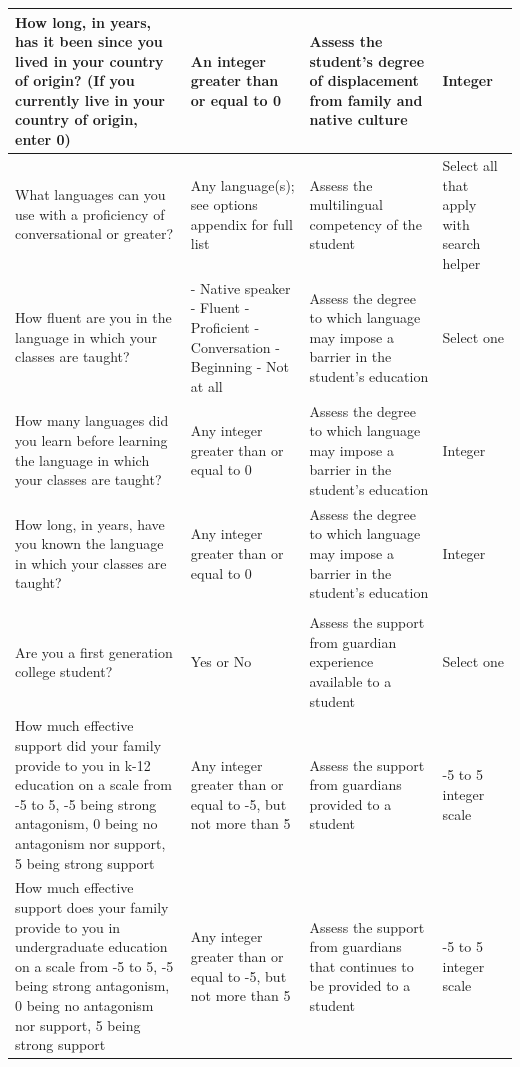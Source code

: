\documentclass[10pt, twocolumn]{article}
\begin{document}
\begin{xltabular}{\textwidth}{|p{0.3\textwidth}|p{0.3\textwidth}|p{0.2\textwidth}|X|}
    How long, in years, has it been since you lived in your country of origin? (If you currently live in your country of origin, enter 0) & An integer greater than or equal to 0 & Assess the student's degree of displacement from family and native culture & Integer \\ \hline 
    What languages can you use with a proficiency of conversational or greater? & Any language(s); see options appendix for full list & Assess the multilingual competency of the student & Select all that apply with search helper \\ \hline 
    How fluent are you in the language in which your classes are taught? & - Native speaker \newline - Fluent \newline - Proficient \newline - Conversation \newline - Beginning \newline - Not at all & Assess the degree to which language may impose a barrier in the student's education & Select one \\ \hline 
    How many languages did you learn before learning the language in which your classes are taught? & Any integer greater than or equal to 0 & Assess the degree to which language may impose a barrier in the student's education & Integer \\ \hline 
    How long, in years, have you known the language in which your classes are taught? & Any integer greater than or equal to 0 & Assess the degree to which language may impose a barrier in the student's education & Integer \\ \hline 
     \\ \hline
    Are you a first generation college student? & Yes or No & Assess the support from guardian experience available to a student & Select one \\ \hline 
    How much effective support did your family provide to you in k-12 education on a scale from -5 to 5, -5 being strong antagonism, 0 being no antagonism nor support, 5 being strong support & Any integer greater than or equal to -5, but not more than 5 & Assess the support from guardians provided to a student & -5 to 5 integer scale \\ \hline 
    How much effective support does your family provide to you in undergraduate education on a scale from -5 to 5, -5 being strong antagonism, 0 being no antagonism nor support, 5 being strong support & Any integer greater than or equal to -5, but not more than 5 & Assess the support from guardians that continues to be provided to a student & -5 to 5 integer scale \\ \hline 

\end{xltabular}
\end{document}
